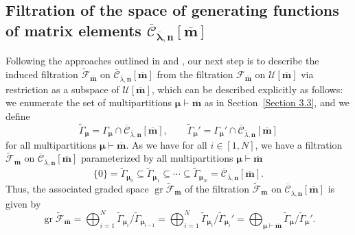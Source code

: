 \documentclass[pdftex]{sigma}
\numberwithin{equation}{section}
\DeclareMathOperator{\gr}{gr}
\begin{document}
\subsection[Filtration of the space of generating functions of matrix elements]{Filtration of the space of generating functions of matrix elements $\boldsymbol{\overline{\mathcal{C}}_{ \overline{\lambda},\mathbf{n}}[\overline{\mathbf{m}}]}$}\label{Section 3.5}

Following the approaches outlined in \cite[Section~5.6]{AKS06} and \cite[Section~5.3]{AK07}, our next step is to describe the induced filtration $\tilde{\mathcal{F}}_{\overline{\mathbf{m}}}$ on $\overline{\mathcal{C}}_{\overline{\lambda},\mathbf{n}}[\overline{\mathbf{m}}]$ from the filtration $\mathcal{F}_{\overline{\mathbf{m}}}$ on $\mathcal{U}[\overline{\mathbf{m}}]$ via restriction as a subspace of $\mathcal{U}[\overline{\mathbf{m}}]$, which can be described explicitly as follows: we enumerate the set of multipartitions $\bm{\mu}\vdash\overline{\mathbf{m}}$ as in Section~\ref{Section 3.3}, and we define
\begin{equation*}
\tilde{\Gamma}_{\bm{\mu}}=\Gamma_{\bm{\mu}}\cap\overline{\mathcal{C}}_{\overline{\lambda},\mathbf{n}}[\overline{\mathbf{m}}], \qquad
\tilde{\Gamma}_{\bm{\mu}}'=\Gamma_{\bm{\mu}}'\cap\overline{\mathcal{C}}_{\overline{\lambda},\mathbf{n}}[\overline{\mathbf{m}}]
\end{equation*}
for all multipartitions $\bm{\mu}\vdash\overline{\mathbf{m}}$. As we have  for all $i\in [1,N]$, we have a filtration~$\tilde{\mathcal{F}}_{\overline{\mathbf{m}}}$ on $\overline{ \mathcal{C}}_{\overline{\lambda},\mathbf{n}}[\overline{ \mathbf{m}}]$ parameterized by all multipartitions $\bm{\mu}\vdash\overline{\mathbf{m}}$
\begin{equation*}
\{0\}=\tilde{\Gamma}_{\bm{\mu}_0}\subseteq\tilde{\Gamma}_{\bm{ \mu}_1}\subseteq\cdots\subseteq\tilde{\Gamma}_{\bm{\mu}_N}= \overline{\mathcal{C}}_{\overline{\lambda},\mathbf{n}}[\overline{\mathbf{m}}].
\end{equation*}
Thus, the associated graded space $\gr\tilde{\mathcal{F}}_{\overline{\mathbf{m}}}$ of the filtration $\tilde{\mathcal{F}}_{\overline{\mathbf{m}}}$ on $\overline{\mathcal{C}}_{\overline{\lambda},\mathbf{n}}[\overline{\mathbf{m}}]$ is given by
\begin{equation}\label{eq:3.44}
\gr\tilde{\mathcal{F}}_{\overline{\mathbf{m}}}
=\bigoplus_{i=1}^N\tilde{\Gamma}_{\bm{\mu}_i}/\tilde{\Gamma}_{\bm{\mu}_{i-1}}
=\bigoplus_{i=1}^N\tilde{\Gamma}_{\bm{\mu}_i}/\tilde{\Gamma}_{\bm{\mu}_i}'
=\bigoplus_{\bm{\mu}\vdash\overline{\mathbf{m}}} \tilde{\Gamma}_{\bm{\mu}}/\tilde{\Gamma}_{\bm{\mu}}'.
\end{equation}
\end{document}
